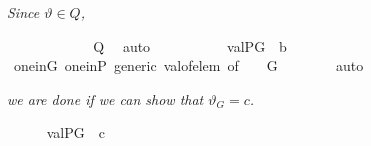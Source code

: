 \textit{Since
  $\vartheta \in Q$,}
\begin{isabelle}
\ \ \ \ \isamarkupfalse%
\isanewline
\ \ \ \ \isamarkupfalse%
\ {\isachardoublequoteopen}{\isacharquery}{\kern0pt}{\isasymtheta}\ {\isasymin}\ {\isacharquery}{\kern0pt}Q{\isachardoublequoteclose}\ \isamarkupfalse%
\ auto\isanewline
\ \ \ \ \isamarkupfalse%
\isanewline
\ \ \ \ \isamarkupfalse%
\ {\isachardoublequoteopen}val{\isacharparenleft}{\kern0pt}P{\isacharcomma}{\kern0pt}G{\isacharcomma}{\kern0pt}{\isacharquery}{\kern0pt}{\isasymtheta}{\isacharparenright}{\kern0pt}\ {\isasymin}\ {\isacharquery}{\kern0pt}b{\isachardoublequoteclose}\isanewline
\ \ \ \ \ \ \isamarkupfalse%
\ one{\isacharunderscore}{\kern0pt}in{\isacharunderscore}{\kern0pt}G\ one{\isacharunderscore}{\kern0pt}in{\isacharunderscore}{\kern0pt}P\ generic\ val{\isacharunderscore}{\kern0pt}of{\isacharunderscore}{\kern0pt}elem\ {\isacharbrackleft}{\kern0pt}of\ {\isacharquery}{\kern0pt}{\isasymtheta}\ {\isasymone}\ {\isacharquery}{\kern0pt}{\isasympi}\ G{\isacharbrackright}{\kern0pt}\isanewline
\ \ \ \ \ \ \isamarkupfalse%
\ auto
\end{isabelle}
\textit{we are done if we can show that
  $\vartheta_{G}=c$.}
\begin{isabelle}
\ \ \ \ \isamarkupfalse%
\ {\isachardoublequoteopen}val{\isacharparenleft}{\kern0pt}P{\isacharcomma}{\kern0pt}G{\isacharcomma}{\kern0pt}{\isacharquery}{\kern0pt}{\isasymtheta}{\isacharparenright}{\kern0pt}\ {\isacharequal}{\kern0pt}\ c{\isachardoublequoteclose}
\end{isabelle}

